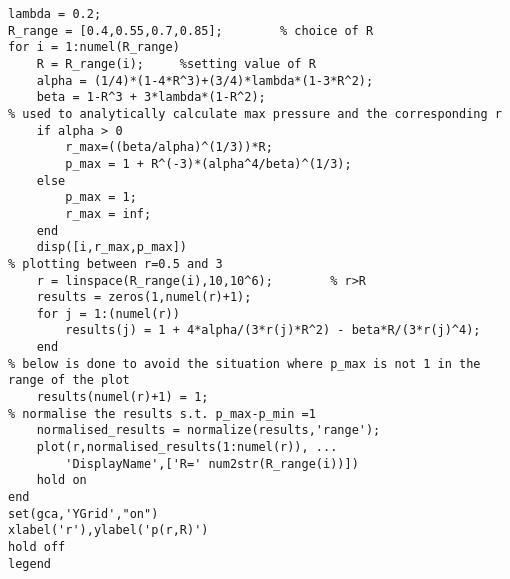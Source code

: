 \lstset{basicstyle=\footnotesize,style=myCustomMatlabStyle}
\begin{lstlisting}
lambda = 0.2;
R_range = [0.4,0.55,0.7,0.85];        % choice of R
for i = 1:numel(R_range)
    R = R_range(i);     %setting value of R
    alpha = (1/4)*(1-4*R^3)+(3/4)*lambda*(1-3*R^2);
    beta = 1-R^3 + 3*lambda*(1-R^2);
% used to analytically calculate max pressure and the corresponding r
    if alpha > 0
        r_max=((beta/alpha)^(1/3))*R;
        p_max = 1 + R^(-3)*(alpha^4/beta)^(1/3);
    else
        p_max = 1;
        r_max = inf;
    end
    disp([i,r_max,p_max])
% plotting between r=0.5 and 3    
    r = linspace(R_range(i),10,10^6);        % r>R
    results = zeros(1,numel(r)+1);
    for j = 1:(numel(r))
        results(j) = 1 + 4*alpha/(3*r(j)*R^2) - beta*R/(3*r(j)^4);
    end
% below is done to avoid the situation where p_max is not 1 in the range of the plot
    results(numel(r)+1) = 1;        
% normalise the results s.t. p_max-p_min =1 
    normalised_results = normalize(results,'range');    
    plot(r,normalised_results(1:numel(r)), ...
        'DisplayName',['R=' num2str(R_range(i))])
    hold on 
end
set(gca,'YGrid',"on")
xlabel('r'),ylabel('p(r,R)')
hold off
legend
\end{lstlisting}